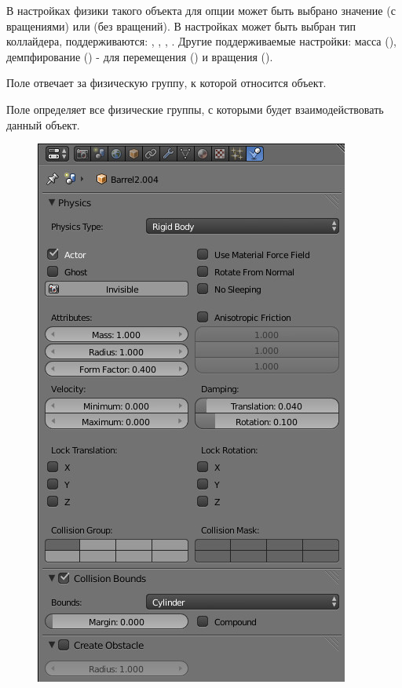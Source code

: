 \documentclass[a4paper,12pt,oneside]{sphinxmanual}
\begin{document}
В настройках физики такого объекта для опции  может быть выбрано значение  (с вращениями) или  (без вращений). В настройках  может быть выбран тип коллайдера, поддерживаются: , , , . Другие поддерживаемые настройки: масса (), демпфирование () - для перемещения () и вращения ().

Поле  отвечает за физическую группу, к которой относится объект.

Поле  определяет все физические группы, с которыми будет взаимодействовать данный объект.
\begin{figure}[htbp]
\centering

\includegraphics[width=0.800\linewidth]{physics_panel_dynamic.jpg}
\end{figure}
\end{document}
